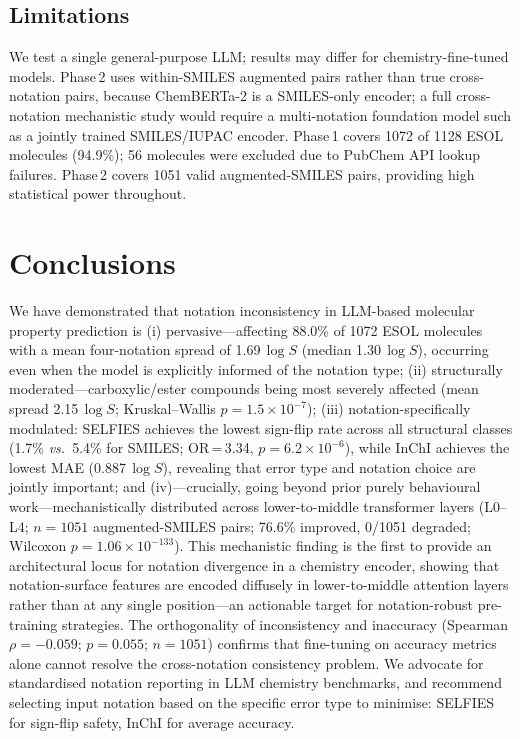 \documentclass[twoside,twocolumn,9pt]{article}
\newcommand{\logS}{\ensuremath{\log S}}
\begin{document}
\subsection*{Limitations}

We test a single general-purpose LLM; results may differ for chemistry-fine-tuned models. Phase\,2 uses within-SMILES augmented pairs rather than true cross-notation pairs, because ChemBERTa-2 is a SMILES-only encoder; a full cross-notation mechanistic study would require a multi-notation foundation model such as a jointly trained SMILES/IUPAC encoder. Phase\,1 covers 1072 of 1128 ESOL molecules (94.9\%); 56 molecules were excluded due to PubChem API lookup failures. Phase\,2 covers 1051 valid augmented-SMILES pairs, providing high statistical power throughout.

\section*{Conclusions}

We have demonstrated that notation inconsistency in LLM-based molecular property prediction is (i) pervasive---affecting 88.0\% of 1072 ESOL molecules with a mean four-notation spread of 1.69\,$\logS$ (median 1.30\,$\logS$), occurring even when the model is explicitly informed of the notation type; (ii) structurally moderated---carboxylic/ester compounds being most severely affected (mean spread 2.15\,$\logS$; Kruskal--Wallis $p=1.5\!\times\!10^{-7}$); (iii) notation-specifically modulated: SELFIES achieves the lowest sign-flip rate across all structural classes (1.7\% \textit{vs.}\ 5.4\% for SMILES; OR\,=\,3.34, $p=6.2\!\times\!10^{-6}$), while InChI achieves the lowest MAE (0.887\,$\logS$), revealing that error type and notation choice are jointly important; and (iv)---crucially, going beyond prior purely behavioural work\cite{yan2025,ganeeva2025}---mechanistically distributed across lower-to-middle transformer layers (L0--L4; $n=1051$ augmented-SMILES pairs; 76.6\% improved, 0/1051 degraded; Wilcoxon $p=1.06\!\times\!10^{-133}$). This mechanistic finding is the first to provide an architectural locus for notation divergence in a chemistry encoder, showing that notation-surface features are encoded diffusely in lower-to-middle attention layers rather than at any single position---an actionable target for notation-robust pre-training strategies. The orthogonality of inconsistency and inaccuracy (Spearman $\rho=-0.059$; $p=0.055$; $n=1051$) confirms that fine-tuning on accuracy metrics alone cannot resolve the cross-notation consistency problem. We advocate for standardised notation reporting in LLM chemistry benchmarks, and recommend selecting input notation based on the specific error type to minimise: SELFIES for sign-flip safety, InChI for average accuracy.
\end{document}
